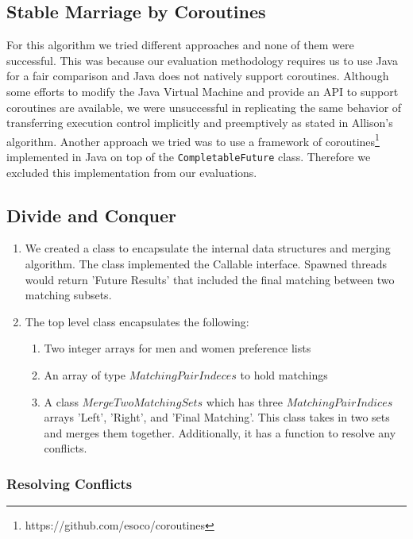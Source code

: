 \subsection{Stable Marriage by Coroutines}

For this algorithm we tried different approaches and none of them were successful. This was because our evaluation methodology requires us to use Java for a fair comparison and Java does not natively support coroutines. Although some efforts to modify the Java Virtual Machine and provide an API to support coroutines are available\cite{jkuserializable}\cite{coroutinesoffbynull}, we were unsuccessful in replicating the same behavior of transferring execution control implicitly and preemptively as stated in Allison's algorithm. Another approach we tried was to use a framework of coroutines\footnote{https://github.com/esoco/coroutines} implemented in Java on top of the \texttt{CompletableFuture} class. 
Therefore we excluded this implementation from our evaluations.

\subsection{Divide and Conquer}

\begin{enumerate}
    \item We created a class to encapsulate the internal data structures and merging algorithm. The class implemented the Callable interface. Spawned threads would return 'Future Results' that included the final matching between two matching subsets. 
    \item The top level class encapsulates the following:
    \begin{enumerate}
    \item Two integer arrays for men and women preference lists
    \item An array of type $MatchingPairIndeces$ to hold matchings
    \item A class $MergeTwoMatchingSets$ which has three $MatchingPairIndices$ arrays 'Left', 'Right', and 'Final Matching'. This class takes in two sets and merges them together. Additionally, it has a function to resolve any conflicts.
    \end{enumerate}
\end{enumerate}

\subsubsection{Resolving Conflicts}

